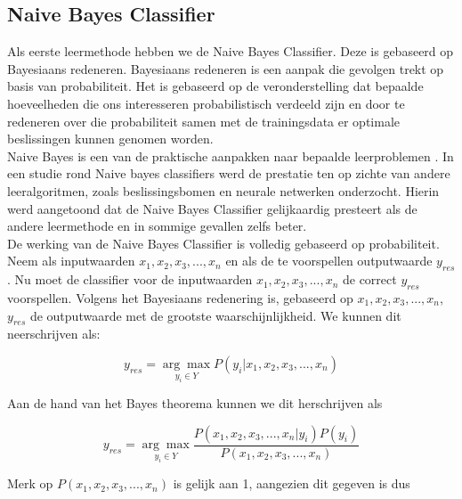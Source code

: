 \subsection{Naive Bayes Classifier}\label{Naive Bayes Classifier}

Als eerste leermethode hebben we de Naive Bayes Classifier. Deze is gebaseerd op Bayesiaans redeneren. Bayesiaans redeneren is een aanpak die gevolgen trekt op basis van probabiliteit. Het is gebaseerd op de veronderstelling dat bepaalde hoeveelheden die ons interesseren probabilistisch verdeeld zijn en door te redeneren over die probabiliteit samen met de trainingsdata er optimale beslissingen kunnen genomen worden.\\%
Naive Bayes is een van de praktische aanpakken naar bepaalde leerproblemen \cite{mitchell1997machine}. In een studie \cite{Michie94machinelearning} rond Naive bayes classifiers werd de  prestatie ten op zichte van andere leeralgoritmen, zoals beslissingsbomen en neurale netwerken onderzocht. Hierin werd aangetoond dat de Naive Bayes Classifier gelijkaardig presteert als de andere leermethode en in sommige gevallen zelfs beter.\\
%
De werking van de Naive Bayes Classifier is volledig gebaseerd op probabiliteit. Neem als inputwaarden $x_{1} , x_{2}, x_{3}, ..., x_{n}$ en als de te voorspellen outputwaarde $y_{res}$. Nu moet de classifier voor de inputwaarden $x_{1} , x_{2}, x_{3}, ..., x_{n}$ de correct $y_{res}$ voorspellen. Volgens het Bayesiaans redenering is, gebaseerd op $x_{1} , x_{2}, x_{3}, ..., x_{n}$,  $y_{res}$ de outputwaarde met de grootste waarschijnlijkheid. We kunnen dit neerschrijven als:

\[y_{res} = \underset{y_i \in Y}{\arg\max}P(y_i|x_{1},x_{2},x_{3},...,x_{n}) \] 

Aan de hand van het Bayes theorema kunnen we dit herschrijven als

\[ y_{res} = \underset{y_i \in Y}{\arg\max}\frac{P(x_{1},x_{2},x_{3},...,x_{n}|y_i)P(y_i)}{P(x_{1},x_{2}, x_{3},...,x_{n})} \]

 Merk op $P(x_{1},x_{2},x_{3},...,x_{n})$ is gelijk aan 1, aangezien dit gegeven is dus

